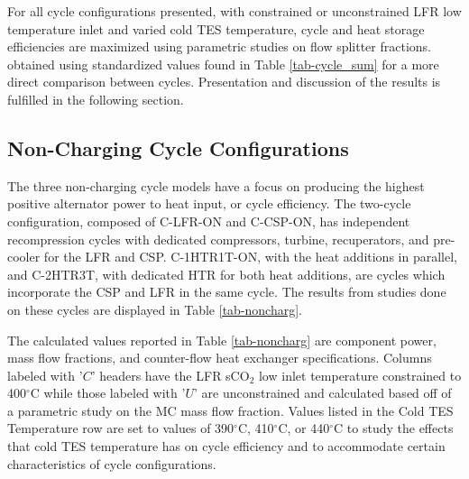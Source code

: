 \begin{paracol}{2}
For all cycle configurations presented, with constrained or unconstrained LFR low temperature inlet and varied cold TES temperature, cycle and heat storage efficiencies are maximized using parametric studies on flow splitter fractions.  obtained using standardized values found in Table \ref{tab-cycle_sum} for a more direct comparison between cycles. Presentation and discussion of the results is fulfilled in the following section. 

\subsection{Non-Charging Cycle Configurations}

The three non-charging cycle models have a focus on producing the highest positive alternator power to heat input, or cycle efficiency. The two-cycle configuration, composed of C-LFR-ON and C-CSP-ON, has independent recompression cycles with dedicated compressors, turbine, recuperators, and pre-cooler for the LFR and CSP. C-1HTR1T-ON, with the heat additions in parallel, and C-2HTR3T, with dedicated HTR for both heat additions, are cycles which incorporate the CSP and LFR in the same cycle. The results from studies done on these cycles are displayed in Table \ref{tab-noncharg}. 

The calculated values reported in Table \ref{tab-noncharg} are component power, mass flow fractions, and counter-flow heat exchanger specifications. Columns labeled with '$C$' headers have the LFR sCO$_2$ low inlet temperature constrained to 400$^{\circ}$C while those labeled with '$U$' are unconstrained and calculated based off of a parametric study on the MC mass flow fraction. Values listed in the Cold TES Temperature row are set to values of 390$^{\circ}$C, 410$^{\circ}$C, or 440$^{\circ}$C to study the effects that cold TES temperature has on cycle efficiency and to accommodate certain characteristics of cycle configurations.  
\clearpage 
\end{paracol}
